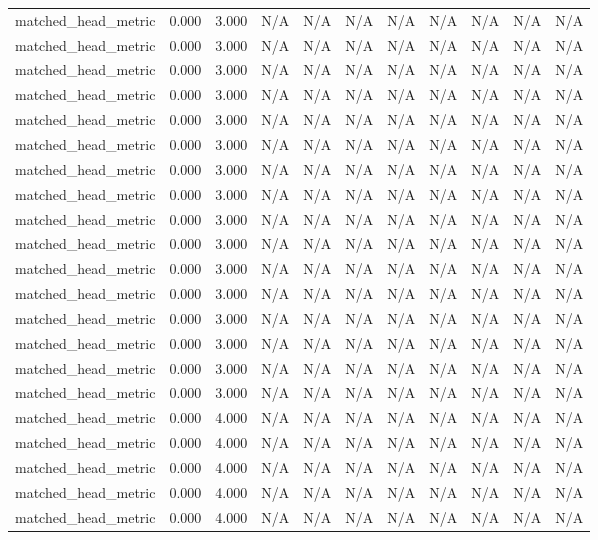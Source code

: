 \begin{table}[h!]
\begin{tabular}{lrrrrrrrrrr}
matched\_head\_metric & 0.000 & 3.000 & N/A & N/A & N/A & N/A & N/A & N/A & N/A & N/A \\
matched\_head\_metric & 0.000 & 3.000 & N/A & N/A & N/A & N/A & N/A & N/A & N/A & N/A \\
matched\_head\_metric & 0.000 & 3.000 & N/A & N/A & N/A & N/A & N/A & N/A & N/A & N/A \\
matched\_head\_metric & 0.000 & 3.000 & N/A & N/A & N/A & N/A & N/A & N/A & N/A & N/A \\
matched\_head\_metric & 0.000 & 3.000 & N/A & N/A & N/A & N/A & N/A & N/A & N/A & N/A \\
matched\_head\_metric & 0.000 & 3.000 & N/A & N/A & N/A & N/A & N/A & N/A & N/A & N/A \\
matched\_head\_metric & 0.000 & 3.000 & N/A & N/A & N/A & N/A & N/A & N/A & N/A & N/A \\
matched\_head\_metric & 0.000 & 3.000 & N/A & N/A & N/A & N/A & N/A & N/A & N/A & N/A \\
matched\_head\_metric & 0.000 & 3.000 & N/A & N/A & N/A & N/A & N/A & N/A & N/A & N/A \\
matched\_head\_metric & 0.000 & 3.000 & N/A & N/A & N/A & N/A & N/A & N/A & N/A & N/A \\
matched\_head\_metric & 0.000 & 3.000 & N/A & N/A & N/A & N/A & N/A & N/A & N/A & N/A \\
matched\_head\_metric & 0.000 & 3.000 & N/A & N/A & N/A & N/A & N/A & N/A & N/A & N/A \\
matched\_head\_metric & 0.000 & 3.000 & N/A & N/A & N/A & N/A & N/A & N/A & N/A & N/A \\
matched\_head\_metric & 0.000 & 3.000 & N/A & N/A & N/A & N/A & N/A & N/A & N/A & N/A \\
matched\_head\_metric & 0.000 & 3.000 & N/A & N/A & N/A & N/A & N/A & N/A & N/A & N/A \\
matched\_head\_metric & 0.000 & 3.000 & N/A & N/A & N/A & N/A & N/A & N/A & N/A & N/A \\
matched\_head\_metric & 0.000 & 4.000 & N/A & N/A & N/A & N/A & N/A & N/A & N/A & N/A \\
matched\_head\_metric & 0.000 & 4.000 & N/A & N/A & N/A & N/A & N/A & N/A & N/A & N/A \\
matched\_head\_metric & 0.000 & 4.000 & N/A & N/A & N/A & N/A & N/A & N/A & N/A & N/A \\
matched\_head\_metric & 0.000 & 4.000 & N/A & N/A & N/A & N/A & N/A & N/A & N/A & N/A \\
matched\_head\_metric & 0.000 & 4.000 & N/A & N/A & N/A & N/A & N/A & N/A & N/A & N/A \\

\end{tabular}
\end{table}
